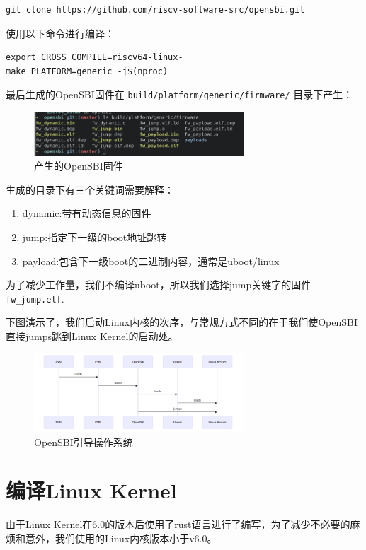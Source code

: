 \documentclass[lang=cn,10pt]{elegantbook}
\begin{document}
\begin{lstlisting}
git clone https://github.com/riscv-software-src/opensbi.git
\end{lstlisting}

使用以下命令进行编译：

\begin{lstlisting}
export CROSS_COMPILE=riscv64-linux-
make PLATFORM=generic -j$(nproc)
\end{lstlisting}
	
最后生成的OpenSBI固件在 \lstinline{build/platform/generic/firmware/} 目录下产生：

\begin{figure}[htbp]
  \centering
  \includegraphics[width=0.7\textwidth]{image/image-20231105093844708.png}
  \caption{产生的OpenSBI固件}
\end{figure}


生成的目录下有三个关键词需要解释：

\begin{enumerate}
\item dynamic:带有动态信息的固件
\item jump:指定下一级的boot地址跳转
\item payload:包含下一级boot的二进制内容，通常是uboot/linux
\end{enumerate}

为了减少工作量，我们不编译uboot，所以我们选择jump关键字的固件 -- \lstinline{fw_jump.elf}.

下图演示了，我们启动Linux内核的次序，与常规方式不同的在于我们使OpenSBI直接jumps跳到Linux Kernel的启动处。

\begin{figure}[htbp]
  \centering
  \includegraphics[width=0.7\textwidth]{image/uboot.png}
  \caption{OpenSBI引导操作系统}
\end{figure}


\section{编译Linux Kernel}
由于Linux Kernel在6.0的版本后使用了rust语言进行了编写，为了减少不必要的麻烦和意外，我们使用的Linux内核版本小于v6.0。
\end{document}
